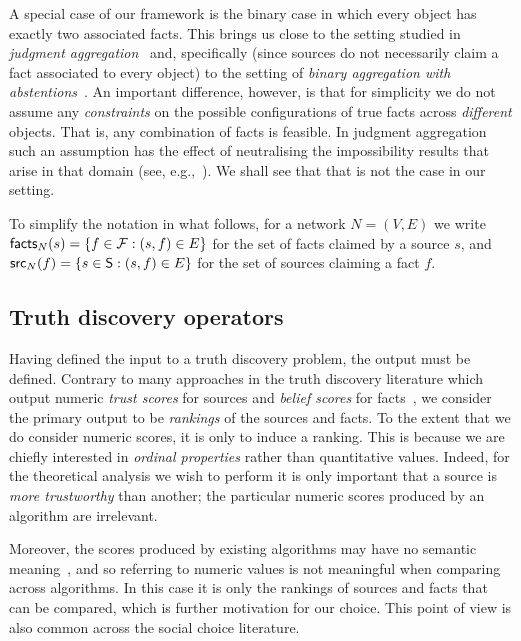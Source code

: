 A special case of our framework is the binary case in which every object has
exactly two associated facts. This brings us close to the setting studied in
{\em judgment aggregation}~\cite{endriss2016ja} and, specifically (since
sources do not necessarily claim a fact associated to every object) to the
setting of {\em binary aggregation with
abstentions}~\cite{christoffbinary,dokow}. An important difference, however, is
that for simplicity we do not assume any {\em constraints} on the possible configurations of
true facts across \emph{different} objects. That is, any combination of facts
is feasible.  In judgment aggregation such an assumption has the effect of
neutralising the impossibility results that arise in that domain (see,
e.g.,~\cite{christoffbinary}). We shall see that that is not the case in our
setting.

To simplify the notation in what follows, for a network $N=(V, E)$ we write
$\mathsf{facts}_N(s) = \{f \in \mathcal{F} : (s, f) \in E\}$ for the set of facts claimed by a
source $s$, and $\mathsf{src}_N(f) = \{s \in \mathsf{S} : (s, f) \in E\}$ for the set of
sources claiming a fact $f$.

\subsection{Truth discovery operators}

Having defined the input to a truth discovery problem, the output must be
defined. Contrary to many approaches in the truth discovery literature which
output numeric \emph{trust scores} for sources and \emph{belief scores} for
facts~\cite{yin2008,pasternack2010,galland2010,zhi2015,zhang_robust_2016,zhang2018},
we consider the primary output to be \emph{rankings} of the sources and facts.
To the extent that we do consider numeric scores, it is only to induce a
ranking. This is because we are chiefly interested in \emph{ordinal properties}
rather than quantitative values. Indeed, for the theoretical analysis we wish
to perform it is only important that a source is \emph{more trustworthy} than
another; the particular numeric scores produced by an algorithm are irrelevant.

Moreover, the scores produced by existing algorithms may have no semantic
meaning~\cite{pasternack2010}, and so referring to numeric values is not
meaningful when comparing across algorithms. In this case it is only the
rankings of sources and facts that can be compared, which is further motivation
for our choice. This point of view is also common across the social choice
literature.

